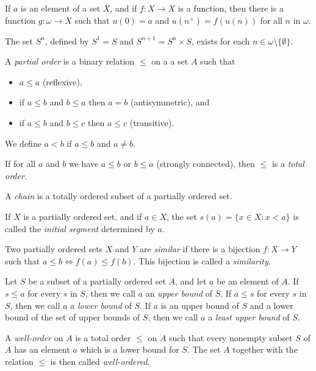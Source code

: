 \begin{thm}[Recursion]
  If $a$ is an element of a set $X$, and if $f:X\to X$ is a function, then there
  is a function $g:\omega\to X$ such that $u(0)=a$ and $u(n^+)=f(u(n))$ for all
  $n$ in $\omega$.
\end{thm}
\begin{prop}
  The set $S^n$, defined by $S^1=S$ and $S^{n+1}=S^n\times S$, exists for each
  $n\in\omega\setminus\{\emptyset\}$.
\end{prop}
\begin{defn}
  A \emph{partial order} is a binary relation $\le$ on a a set $A$ such that
  \begin{itemize}
    \item $a\le a$ (reflexive),
    \item if $a\le b$ and $b\le a$ then $a=b$ (antisymmetric), and
    \item if $a\le b$ and $b\le c$ then $a\le c$ (transitive).
  \end{itemize}
  We define $a<b$ if $a\le b$ and $a\ne b$.

  If for all $a$ and $b$ we have $a\le b$ or $b\le a$ (strongly connected),
  then $\le$ is a \emph{total order}. 

  A \emph{chain} is a totally ordered subset of a partially ordered set.
\end{defn}
\begin{defn}
  If $X$ is a partially ordered set, and if $a\in X$, the set $s(a)=\{x\in
    X:x<a\}$ is called the \emph{initial segment} determined by $a$.
\end{defn}
\begin{defn}
  Two partially ordered sets $X$ and $Y$ are \emph{similar} if there is a
  bijection $f:X\to Y$ such that $a\le b\iff f(a)\le f(b)$. This bijection is
  called a \emph{similarity}.
\end{defn}
\begin{defn}
  Let $S$ be a subset of a partially ordered set $A$, and let $a$ be an element
  of $A$. If $s\le a$ for every $s$ in $S$, then we call $a$ an \emph{upper
    bound} of $S$. If $a\le s$ for every $s$ in $S$, then we call $a$ a
    \emph{lower bound} of $S$. If $a$ is an upper bound of $S$ and a lower
    bound of the set of upper bounds of $S$, then we call $a$ a \emph{least
      upper bound} of $S$.
\end{defn}
\begin{defn}
  A \emph{well-order} on $A$ is a total order $\le$ on $A$ such that every
  nonempty subset $S$ of $A$ has an element $a$ which is a lower bound for $S$.
  The set $A$ together with the relation $\le$ is then called \emph{well-ordered}.
\end{defn}
